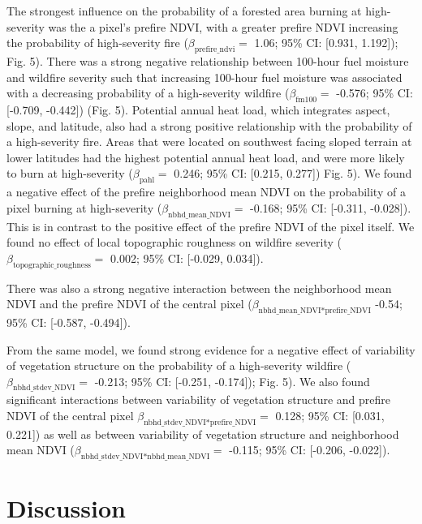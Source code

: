 \documentclass[]{article}
\begin{document}
The strongest influence on the probability of a forested area burning at
high-severity was the a pixel's prefire NDVI, with a greater prefire
NDVI increasing the probability of high-severity fire
(\(\beta_{\text{prefire\_ndvi}}=\) 1.06; 95\% CI: {[}0.931, 1.192{]});
Fig. 5). There was a strong negative relationship between 100-hour fuel
moisture and wildfire severity such that increasing 100-hour fuel
moisture was associated with a decreasing probability of a high-severity
wildfire (\(\beta_{\text{fm100}}=\) -0.576; 95\% CI: {[}-0.709,
-0.442{]}) (Fig. 5). Potential annual heat load, which integrates
aspect, slope, and latitude, also had a strong positive relationship
with the probability of a high-severity fire. Areas that were located on
southwest facing sloped terrain at lower latitudes had the highest
potential annual heat load, and were more likely to burn at
high-severity (\(\beta_{\text{pahl}}=\) 0.246; 95\% CI: {[}0.215,
0.277{]}) Fig. 5). We found a negative effect of the prefire
neighborhood mean NDVI on the probability of a pixel burning at
high-severity (\(\beta_{\text{nbhd\_mean\_NDVI}}=\) -0.168; 95\% CI:
{[}-0.311, -0.028{]}). This is in contrast to the positive effect of the
prefire NDVI of the pixel itself. We found no effect of local
topographic roughness on wildfire severity
(\(\beta_{\text{topographic\_roughness}}=\) 0.002; 95\% CI: {[}-0.029,
0.034{]}).

There was also a strong negative interaction between the neighborhood
mean NDVI and the prefire NDVI of the central pixel
(\(\beta_{\text{nbhd\_mean\_NDVI*prefire\_NDVI}}\) -0.54; 95\% CI:
{[}-0.587, -0.494{]}).

From the same model, we found strong evidence for a negative effect of
variability of vegetation structure on the probability of a
high-severity wildfire (\(\beta_{\text{nbhd\_stdev\_NDVI}}=\) -0.213;
95\% CI: {[}-0.251, -0.174{]}); Fig. 5). We also found significant
interactions between variability of vegetation structure and prefire
NDVI of the central pixel
\(\beta_{\text{nbhd\_stdev\_NDVI*prefire\_NDVI}}=\) 0.128; 95\% CI:
{[}0.031, 0.221{]}) as well as between variability of vegetation
structure and neighborhood mean NDVI
(\(\beta_{\text{nbhd\_stdev\_NDVI*nbhd\_mean\_NDVI}}=\) -0.115; 95\% CI:
{[}-0.206, -0.022{]}).

\hypertarget{discussion}{%
\section{Discussion}\label{discussion}}
\end{document}
